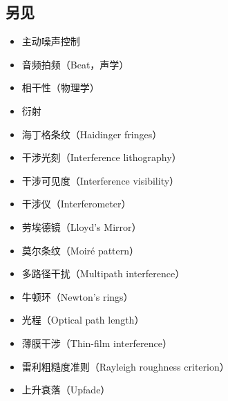 \subsection{另见}
\begin{itemize}
\item 主动噪声控制
\item 音频拍频（Beat，声学）
\item 相干性（物理学）
\item 衍射
\item 海丁格条纹（Haidinger fringes）
\item 干涉光刻（Interference lithography）
\item 干涉可见度（Interference visibility）
\item 干涉仪（Interferometer）
\item 劳埃德镜（Lloyd's Mirror）
\item 莫尔条纹（Moiré pattern）
\item 多路径干扰（Multipath interference）
\item 牛顿环（Newton's rings）
\item 光程（Optical path length）
\item 薄膜干涉（Thin-film interference）
\item 雷利粗糙度准则（Rayleigh roughness criterion）
\item 上升衰落（Upfade）
\end{itemize}
